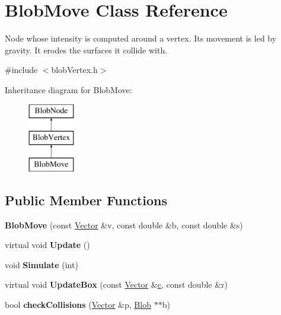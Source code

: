 \hypertarget{class_blob_move}{
\section{BlobMove Class Reference}
\label{class_blob_move}
}


Node whose intensity is computed around a vertex. Its movement is led by gravity. It erodes the surfaces it collide with.  




{\ttfamily \#include $<$blobVertex.h$>$}

Inheritance diagram for BlobMove:\begin{figure}[H]
\begin{center}
\leavevmode
\includegraphics[height=3.000000cm]{class_blob_move}
\end{center}
\end{figure}
\subsection*{Public Member Functions}
\begin{DoxyCompactItemize}
\item 
\hypertarget{class_blob_move_ae3fc4eeb3ac01dd2ebec600103b673f1}{
{\bfseries BlobMove} (const \hyperlink{class_vector}{Vector} \&v, const double \&b, const double \&s)}
\label{class_blob_move_ae3fc4eeb3ac01dd2ebec600103b673f1}

\item 
\hypertarget{class_blob_move_a5b3085683b93c8358e018a26adfac241}{
virtual void {\bfseries Update} ()}
\label{class_blob_move_a5b3085683b93c8358e018a26adfac241}

\item 
\hypertarget{class_blob_move_ad91c34abe256a759e6cb25b96ac4178c}{
void {\bfseries Simulate} (int)}
\label{class_blob_move_ad91c34abe256a759e6cb25b96ac4178c}

\item 
\hypertarget{class_blob_move_adb9858f39d6079522863f166f1a4bfb0}{
virtual void {\bfseries UpdateBox} (const \hyperlink{class_vector}{Vector} \&\hyperlink{class_blob_vertex_ab14551703c3eda8a5702dd0529ba741e}{c}, const double \&r)}
\label{class_blob_move_adb9858f39d6079522863f166f1a4bfb0}

\item 
\hypertarget{class_blob_move_a4f7121956cd4b46cdddc8448481179da}{
bool {\bfseries checkCollisions} (\hyperlink{class_vector}{Vector} \&p, \hyperlink{class_blob}{Blob} $\ast$$\ast$b)}
\label{class_blob_move_a4f7121956cd4b46cdddc8448481179da}

\end{DoxyCompactItemize}
